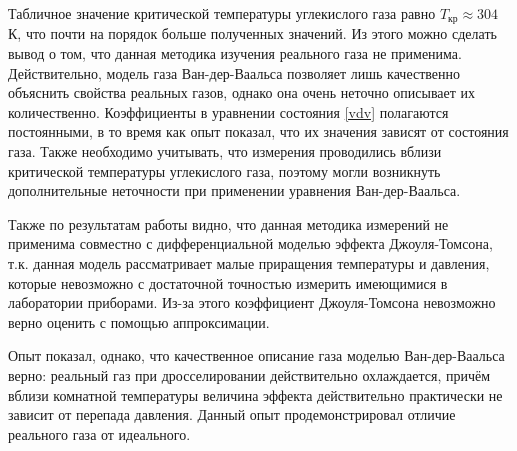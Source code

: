\documentclass[a4paper,12pt]{article} %
\begin{document}
Табличное значение критической температуры углекислого газа равно $T_\text{кр} \approx 304$ К, что почти на порядок больше полученных значений. Из этого можно сделать вывод о том, что данная методика изучения реального газа не применима. Действительно, модель газа Ван-дер-Ваальса позволяет лишь качественно объяснить свойства реальных газов, однако она очень неточно описывает их количественно. Коэффициенты в уравнении состояния \eqref{vdv} полагаются постоянными, в то время как опыт показал, что их значения зависят от состояния газа. Также необходимо учитывать, что измерения проводились вблизи критической температуры углекислого газа, поэтому могли возникнуть дополнительные неточности при применении уравнения Ван-дер-Ваальса.

Также по результатам работы видно, что данная методика измерений не применима совместно с дифференциальной моделью эффекта Джоуля-Томсона, т.к. данная модель рассматривает малые приращения температуры и давления, которые невозможно с достаточной точностью измерить имеющимися в лаборатории приборами. Из-за этого коэффициент Джоуля-Томсона невозможно верно оценить с помощью аппроксимации.

Опыт показал, однако, что качественное описание газа моделью Ван-дер-Ваальса верно: реальный газ при дросселировании действительно охлаждается, причём вблизи комнатной температуры величина эффекта действительно практически не зависит от перепада давления. Данный опыт продемонстрировал отличие реального газа от идеального. 
\end{document}
